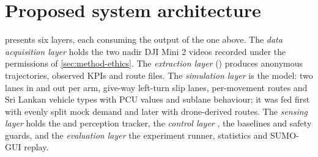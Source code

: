 \section{Proposed system architecture}\label{sec:srs-arch}

 presents six layers, each consuming the output of the one above. The \emph{data acquisition layer} holds the two nadir DJI Mini 2 videos recorded under the permissions of \cref{sec:method-ethics}. The \emph{extraction layer} (\dtx{}) produces anonymous trajectories, observed KPIs and route files. The \emph{simulation layer} is the \sumo{} model: two lanes in and out per arm, give-way left-turn slip lanes, per-movement routes and Sri Lankan vehicle types with PCU values and sublane behaviour; it was fed first with evenly split mock demand and later with drone-derived routes. The \emph{sensing layer} holds the \vls{} and perception tracker, the \emph{control layer} \prism{}, the baselines and safety guards, and the \emph{evaluation layer} the experiment runner, statistics and SUMO-GUI replay.


